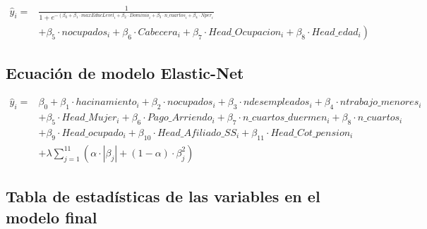 \documentclass[a4paper]{article}
\theoremstyle{remark}
\theoremstyle{definition}
\begin{document}
\begin{equation}
\begin{aligned}
\hat{y}_i = & \frac{1}{1 + e^{-\left( \beta_0 + \beta_1 \cdot maxEducLevel_i + \beta_2 \cdot Dominio_i + \beta_3 \cdot n\_cuartos_i + \beta_4 \cdot Nper_i \right.}} \\
& \left. + \beta_5 \cdot nocupados_i + \beta_6 \cdot Cabecera_i + \beta_7 \cdot Head\_Ocupacion_i + \beta_8 \cdot Head\_edad_i \right)
\end{aligned}
\end{equation}

\subsection{Ecuación de modelo Elastic-Net}

\begin{equation}
\begin{aligned}
\hat{y}_i = & \beta_0 + \beta_1 \cdot hacinamiento_i + \beta_2 \cdot nocupados_i + \beta_3 \cdot ndesempleados_i + \beta_4 \cdot ntrabajo\_menores_i \\
& + \beta_5 \cdot Head\_Mujer_i + \beta_6 \cdot Pago\_Arriendo_i + \beta_7 \cdot n\_cuartos\_duermen_i + \beta_8 \cdot n\_cuartos_i \\
& + \beta_9 \cdot Head\_ocupado_i + \beta_{10} \cdot Head\_Afiliado\_SS_i + \beta_{11} \cdot Head\_Cot\_pension_i \\
& + \lambda \sum_{j=1}^{11} \left( \alpha \cdot |\beta_j| + (1 - \alpha) \cdot \beta_j^2 \right)
\end{aligned}
\end{equation}





\subsection{Tabla de estadísticas de las variables en el modelo final}
\end{document}

